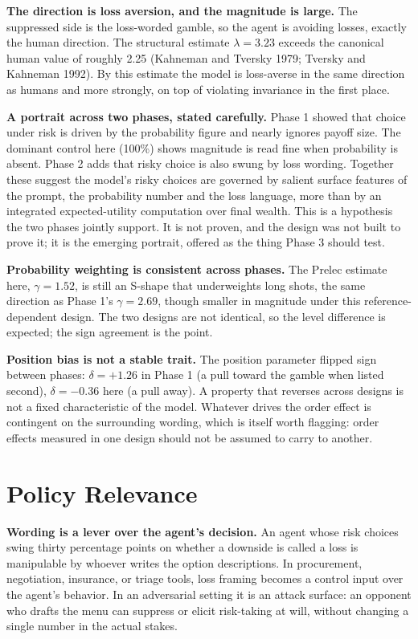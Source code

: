 \documentclass[11pt]{article}
\begin{document}
\textbf{The direction is loss aversion, and the magnitude is large.} The suppressed side is the
loss-worded gamble, so the agent is avoiding losses, exactly the human direction. The structural estimate
$\lambda = 3.23$ exceeds the canonical human value of roughly 2.25 (Kahneman and Tversky 1979; Tversky
and Kahneman 1992). By this estimate the model is loss-averse in the same direction as humans and more
strongly, on top of violating invariance in the first place.

\textbf{A portrait across two phases, stated carefully.} Phase 1 showed that choice under risk is driven
by the probability figure and nearly ignores payoff size. The dominant control here (100\%) shows
magnitude is read fine when probability is absent. Phase 2 adds that risky choice is also swung by loss
wording. Together these suggest the model's risky choices are governed by salient surface features of the
prompt, the probability number and the loss language, more than by an integrated expected-utility
computation over final wealth. This is a hypothesis the two phases jointly support. It is not proven, and
the design was not built to prove it; it is the emerging portrait, offered as the thing Phase 3 should
test.

\textbf{Probability weighting is consistent across phases.} The Prelec estimate here, $\gamma = 1.52$,
is still an S-shape that underweights long shots, the same direction as Phase 1's $\gamma = 2.69$, though
smaller in magnitude under this reference-dependent design. The two designs are not identical, so the
level difference is expected; the sign agreement is the point.

\textbf{Position bias is not a stable trait.} The position parameter flipped sign between phases:
$\delta = +1.26$ in Phase 1 (a pull toward the gamble when listed second), $\delta = -0.36$ here (a pull
away). A property that reverses across designs is not a fixed characteristic of the model. Whatever
drives the order effect is contingent on the surrounding wording, which is itself worth flagging: order
effects measured in one design should not be assumed to carry to another.

\section{Policy Relevance}

\textbf{Wording is a lever over the agent's decision.} An agent whose risk choices swing thirty
percentage points on whether a downside is called a loss is manipulable by whoever writes the option
descriptions. In procurement, negotiation, insurance, or triage tools, loss framing becomes a control
input over the agent's behavior. In an adversarial setting it is an attack surface: an opponent who
drafts the menu can suppress or elicit risk-taking at will, without changing a single number in the
actual stakes.
\end{document}
